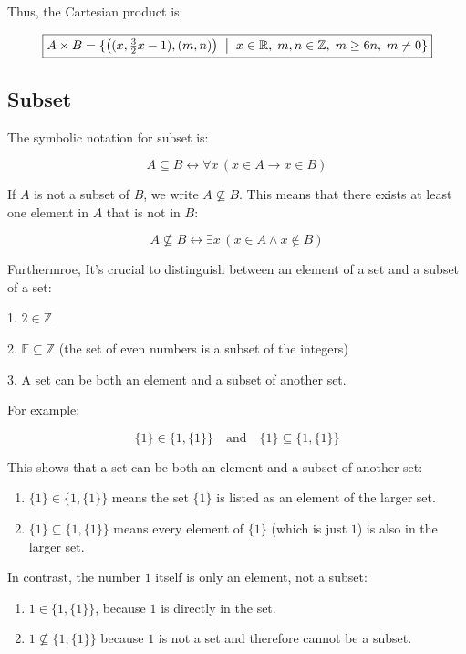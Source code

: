 \documentclass[12pt,a4paper,openany]{article}
\begin{document}
Thus, the Cartesian product is:

$$
\boxed{
A \times B = \{ \bigl((x, \tfrac{3}{2}x - 1), (m,n)\bigr) \;\bigm|\; x \in \mathbb{R},\; m,n \in \mathbb{Z},\; m \ge 6n,\; m \neq 0 \}
}
$$

\subsection{Subset}\label{Subset}
The symbolic notation for subset is:

$$
A \subseteq B \leftrightarrow \forall x \, (x \in A \to x \in B)
$$

If $A$ is not a subset of $B$, we write $A \nsubseteq B$. This means that there exists at least one element in $A$ that is not in $B$:

$$
A \nsubseteq B \leftrightarrow \exists x \, (x \in A \land x \notin B)
$$

Furthermroe, It's crucial to distinguish between an element of a set and a subset of a set:

1. $2 \in \mathbb{Z}$

2. $\mathbb{E} \subseteq \mathbb{Z}$ (the set of even numbers is a subset of the integers)  

3. A set can be both an element and a subset of another set. 

For example:  

$$
\{1\} \in \{1, \{1\}\} \quad \text{and} \quad \{1\} \subseteq \{1, \{1\}\}
$$

This shows that a set can be both an element and a subset of another set:

\begin{enumerate}
  \item $\{1\} \in \{1, \{1\}\}$ means the set $\{1\}$ is listed as an element of the larger set.
  \item $\{1\} \subseteq \{1, \{1\}\}$ means every element of $\{1\}$ (which is just $1$) is also in the larger set.
\end{enumerate}

In contrast, the number $1$ itself is only an element, not a subset:

\begin{enumerate}
  \item $1 \in \{1, \{1\}\}$, because $1$ is directly in the set.
  \item $1 \nsubseteq \{1, \{1\}\}$ because $1$ is not a set and therefore cannot be a subset.
\end{enumerate}
\end{document}
